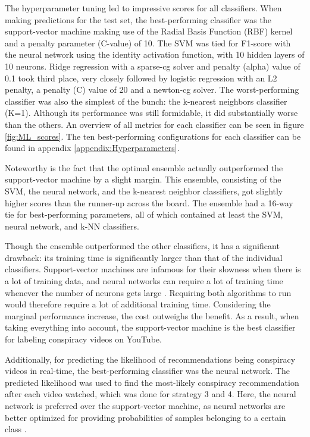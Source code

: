 \documentclass[../main.tex]{subfiles}
\begin{document}
The hyperparameter tuning led to impressive scores for all classifiers. When making predictions for the
test set, the best-performing classifier was the support-vector machine making use of the Radial Basis
Function (RBF) kernel and a penalty parameter (C-value) of 10. The SVM was tied for F1-score with the neural 
network using the identity activation function, with 10 hidden layers of 10 neurons. Ridge regression with a 
sparse-cg solver and penalty (alpha) value of 0.1 took third place, very closely followed by logistic 
regression with an L2 penalty, a penalty (C) value of 20 and a newton-cg solver. The worst-performing 
classifier was also the simplest of the bunch: the k-nearest neighbors classifier (K=1). Although its 
performance was still formidable, it did substantially worse than the others. An overview of all metrics for 
each classifier can be seen in figure \ref{fig:ML_scores}. The ten best-performing configurations for each
classifier can be found in appendix \ref{appendix:Hyperparameters}.

Noteworthy is the fact that the optimal ensemble actually outperformed the support-vector machine by a
slight margin. This ensemble, consisting of the SVM, the neural network, and the k-nearest
neighbor classifiers, got slightly higher scores than the runner-up across the board. The ensemble had
a 16-way tie for best-performing parameters, all of which contained at least the SVM, neural network,
and k-NN classifiers. 

Though the ensemble outperformed the other classifiers, it has a significant drawback: its training time
is significantly larger than that of the individual classifiers. Support-vector machines are infamous
for their slowness when there is a lot of training data, and neural networks can require a lot of
training time whenever the number of neurons gets large \citep{burges1997improving,
kamarthi1999accelerating}. Requiring both algorithms to run would therefore require a lot of additional
training time. Considering the marginal performance increase, the cost outweighs the benefit. As a
result, when taking everything into account, the support-vector machine is the best classifier for
labeling conspiracy videos on YouTube.

Additionally, for predicting the likelihood of recommendations being conspiracy videos in real-time, the 
best-performing classifier was the neural network. The predicted likelihood was used to find the most-likely 
conspiracy recommendation after each video watched, which was done for strategy 3 and 4. Here, the neural 
network is preferred over the support-vector machine, as neural networks are better optimized for providing 
probabilities of samples belonging to a certain class \citep{specht1990probabilistic}.
\end{document}
